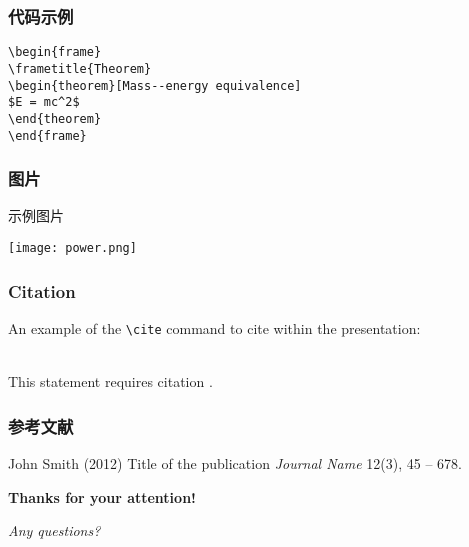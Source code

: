 
\begin{frame}[fragile] %
\frametitle{代码示例}
\begin{example}
\begin{verbatim}
\begin{frame}
\frametitle{Theorem}
\begin{theorem}[Mass--energy equivalence]
$E = mc^2$
\end{theorem}
\end{frame}\end{verbatim}
\end{example}
\end{frame}


\begin{frame}
\frametitle{图片}
示例图片
	\begin{center}
		\texttt{[image: power.png]}
	\end{center}
\end{frame}


\begin{frame}[fragile] %
\frametitle{Citation}
An example of the \verb|\cite| command to cite within the presentation:\\~

This statement requires citation \cite{p1}.
\end{frame}


\begin{frame}
\frametitle{参考文献}
\footnotesize{
\begin{thebibliography}{99} %
 John Smith (2012)
\newblock Title of the publication
\newblock \emph{Journal Name} 12(3), 45 -- 678.
\end{thebibliography}
}
\end{frame}

\begin{frame}[plain]
		\begin{center}
			\Huge{\textbf{Thanks for your attention!}}
			
			\Huge{\textit{Any questions?}}
		\end{center}
\end{frame}


 